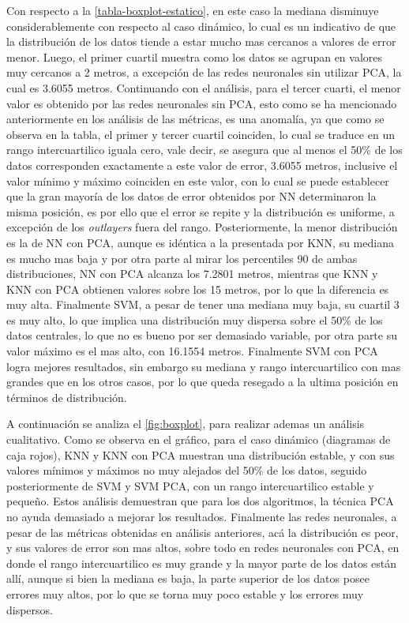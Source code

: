 Con respecto a la \autoref{tabla-boxplot-estatico}, en este caso la mediana disminuye considerablemente con respecto al caso dinámico, lo cual es un indicativo de que la distribución de los datos tiende a estar mucho mas cercanos a valores de error menor. Luego, el primer cuartil muestra como los datos se agrupan en valores muy cercanos a 2 metros, a excepción de las redes neuronales sin utilizar PCA, la cual es 3.6055 metros. Continuando con el análisis, para el tercer cuarti, el menor valor es obtenido por las redes neuronales sin PCA, esto como se ha mencionado anteriormente en los análisis de las métricas, es una anomalía, ya que como se observa en la tabla, el primer y tercer cuartil coinciden, lo cual se traduce en un rango intercuartilico iguala cero, vale decir, se asegura que al menos el 50\% de los datos corresponden exactamente a este valor de error, 3.6055 metros, inclusive el valor mínimo y máximo coinciden en este valor, con lo cual se puede establecer que la gran mayoría de los datos de error obtenidos por NN determinaron la misma posición, es por ello que el error se repite y la distribución es uniforme, a excepción de los \textit{outlayers} fuera del rango. Posteriormente, la menor distribución es la de NN con PCA, aunque es idéntica a la presentada por KNN, su mediana es mucho mas baja y por otra parte al mirar los percentiles 90 de ambas distribuciones, NN con PCA alcanza los 7.2801 metros, mientras que KNN y KNN con PCA obtienen valores sobre los 15 metros, por lo que la diferencia es muy alta. Finalmente SVM, a pesar de tener una mediana muy baja, su cuartil 3 es muy alto, lo que implica una distribución muy dispersa sobre el 50\% de los datos centrales, lo que no es bueno por ser demasiado variable, por otra parte su valor máximo es el mas alto, con 16.1554 metros. Finalmente SVM con PCA logra mejores resultados, sin embargo su mediana y rango intercuartilico con mas grandes que en los otros casos, por lo que queda resegado a la ultima posición en términos de distribución.

A continuación se analiza el \autoref{fig:boxplot}, para realizar ademas un análisis cualitativo. Como se observa en el gráfico, para el caso dinámico (diagramas de caja rojos), KNN y KNN con PCA muestran una distribución estable, y con sus valores mínimos y máximos no muy alejados del 50\% de los datos, seguido posteriormente de SVM y SVM PCA, con un rango intercuartilico estable y pequeño. Estos análisis demuestran que para los dos algoritmos, la técnica PCA no ayuda demasiado a mejorar los resultados. Finalmente las redes neuronales, a pesar de las métricas obtenidas en análisis anteriores, acá la distribución es peor, y sus valores de error son mas altos, sobre todo en redes neuronales con PCA, en donde el rango intercuartilico es muy grande y la mayor parte de los datos están allí, aunque si bien la mediana es baja, la parte superior de los datos posee errores muy altos, por lo que se torna muy poco estable y los errores muy dispersos.

